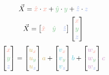 \documentclass[preview]{standalone}
\begin{document}
$$\vec{X} = \textcolor[HTML]{f9a598}{\hat{x}}\cdot \textcolor[HTML]{f9a598}{x} + \textcolor[HTML]{87c993}{\hat{y}}\cdot \textcolor[HTML]{87c993}{y} + \textcolor[HTML]{94acef}{\hat{z}}\cdot \textcolor[HTML]{94acef}{z}$$
$$\vec{X} = \begin{bmatrix}\textcolor[HTML]{f9a598}{\hat{x}}&\textcolor[HTML]{87c993}{\hat{y}}&\textcolor[HTML]{94acef}{\hat{z}}\end{bmatrix}\begin{bmatrix}\textcolor[HTML]{f9a598}{x}\\\textcolor[HTML]{87c993}{y}\\\textcolor[HTML]{94acef}{z}\end{bmatrix}$$
$$\begin{bmatrix}\textcolor[HTML]{f9a598}{x}\\\textcolor[HTML]{87c993}{y}\\\textcolor[HTML]{94acef}{z}\end{bmatrix} =
\begin{bmatrix}\textcolor[HTML]{d4b76b}{u}_{\textcolor[HTML]{f9a598}{x}}\\\textcolor[HTML]{d4b76b}{u}_{\textcolor[HTML]{87c993}{y}}\\\textcolor[HTML]{d4b76b}{u}_{\textcolor[HTML]{94acef}{z}}\end{bmatrix}\textcolor[HTML]{d4b76b}{a} +
\begin{bmatrix}\textcolor[HTML]{58c4d5}{v}_{\textcolor[HTML]{f9a598}{x}}\\\textcolor[HTML]{58c4d5}{v}_{\textcolor[HTML]{87c993}{y}}\\\textcolor[HTML]{58c4d5}{v}_{\textcolor[HTML]{94acef}{z}}\end{bmatrix}\textcolor[HTML]{58c4d5}{b} +
\begin{bmatrix}\textcolor[HTML]{ce93ca}{w}_{\textcolor[HTML]{f9a598}{x}}\\\textcolor[HTML]{ce93ca}{w}_{\textcolor[HTML]{87c993}{y}}\\\textcolor[HTML]{ce93ca}{w}_{\textcolor[HTML]{94acef}{z}}\end{bmatrix}\textcolor[HTML]{ce93ca}{c}$$
\end{document}

